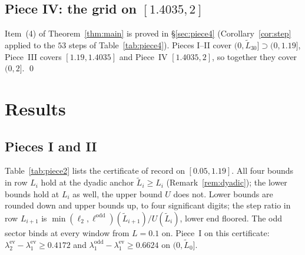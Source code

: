 \documentclass[11pt]{amsart}
\newcommand{\Lmax}{2}                                     %
\newcommand{\ev}{\mathrm{ev}}
\newcommand{\od}{\mathrm{odd}}
\theoremstyle{definition}
\theoremstyle{remark}
\numberwithin{equation}{section}
\begin{document}
\subsection{Piece IV: the grid on $[1.4035,2]$}\label{sec:piece4proof}
Item~(4) of Theorem~\ref{thm:main} is proved in \S\ref{sec:piece4} (Corollary~\ref{cor:step} applied to the $53$ steps of Table~\ref{tab:piece4}). Pieces I--II cover $(0,\tilde L_{30}]\supset(0,1.19]$, Piece~III covers $[1.19,1.4035]$ and Piece~IV $[1.4035,\Lmax]$, so together they cover $(0,\Lmax]$. \qed

\section{Results}\label{sec:results}

\subsection{Pieces I and II}
Table~\ref{tab:piece2} lists the certificate of record on $[0.05,1.19]$. All four bounds in row $L_i$ hold at the dyadic anchor $\tilde L_i\ge L_i$ (Remark~\ref{rem:dyadic}); the lower bounds hold at $L_i$ as well, the upper bound $U$ does not. Lower bounds are rounded down and upper bounds up, to four significant digits; the step ratio in row $L_{i+1}$ is $\min(\ell_2,\ell^\od)(\tilde L_{i+1})/U(\tilde L_i)$, lower end floored. The odd sector binds at every window from $L=0.1$ on. Piece~I on this certificate: $\lambda_2^\ev-\lambda_1^\ev\ge0.4172$ and $\lambda_1^\od-\lambda_1^\ev\ge0.6624$ on $(0,\tilde L_0]$.
\end{document}
